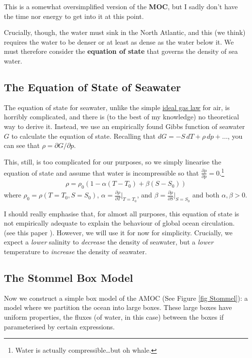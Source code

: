 This is a somewhat oversimplified version of the \textbf{MOC}, but I sadly don't have the time nor energy to get into it at this point.

Crucially, though, the water must sink in the North Atlantic, and this (we think) requires the water to be denser or at least as dense as the water below it. We must therefore consider the \textbf{equation of state} that governs the density of sea water.

\subsection{The Equation of State of Seawater}

The equation of state for seawater, unlike the simple \hyperref[b Ideal Gas]{ideal gas law} for air, is horribly complicated, and there is (to the best of my knowledge) no theoretical way to derive it. Instead, we use an empirically found Gibbs function of seawater \(G\) to calculate the equation of state. Recalling that \(dG = -S\,dT + \rho\,dp+\dots\), you can see that \(\rho=\partial G/\partial p\).

This, still, is too complicated for our purposes, so we simply linearise the equation of state and assume that water is incompressible so that \(\frac{\partial \rho}{\partial p}=0\).\footnote{Water is actually compressible\dots but oh whale.}
\begin{gather}
    \rho=\rho_0(1-\alpha (T-T_0)+\beta(S-S_0))
\end{gather}
where \(\rho_0 = \rho(T=T_0,S=S_0)\), \(\alpha = \frac{\partial \rho}{\partial T}|_{T=T_0}\), and \(\beta = \frac{\partial \rho}{\partial S}|_{S=S_0}\) and both \(\alpha,\beta>0\).

I should really emphasise that, for almost all purposes, this equation of state is not empirically adequate to explain the behaviour of global ocean circulation. (see this paper \cite{N15}). However, we will use it for now for simplicity. Crucially, we expect a \textit{lower} salinity to \textit{decrease} the density of seawater, but a \textit{lower} temperature to \textit{increase} the density of seawater.

\subsection{The Stommel Box Model}

Now we construct a simple box model of the AMOC (See Figure \ref{fig Stommel}): a model where we partition the ocean into large boxes. These large boxes have uniform properties, the fluxes (of water, in this case) between the boxes if parameterised by certain expressions.

